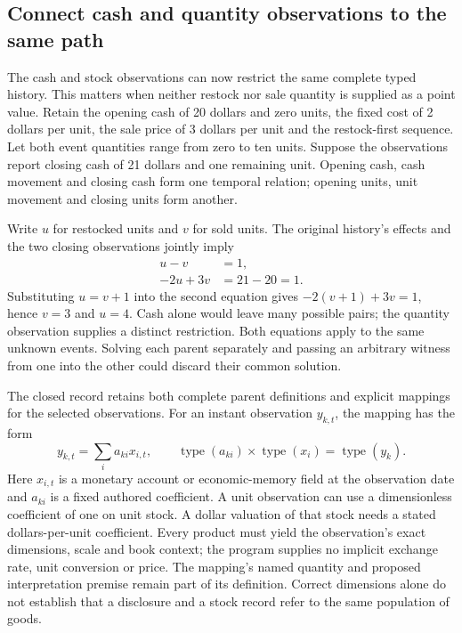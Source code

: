 \subsection{Connect cash and quantity observations to the same path}
\label{sec:typed-history-observation-attachment}

The cash and stock observations can now restrict the same complete typed
history. This matters when neither restock nor sale quantity is supplied as a
point value. Retain the opening cash of 20 dollars and zero units, the fixed
cost of 2 dollars per unit, the sale price of 3 dollars per unit and the
restock-first sequence. Let both event quantities range from zero to ten units.
Suppose the observations report closing cash of 21 dollars and one remaining
unit. Opening cash, cash movement and closing cash form one temporal relation;
opening units, unit movement and closing units form another.

Write \(u\) for restocked units and \(v\) for sold units. The original
history's effects and the two closing observations jointly imply
\begin{align}
\label{eq:typed-observation-solution}
 u-v&=1,\\
 -2u+3v&=21-20=1.
\end{align}
Substituting \(u=v+1\) into the second equation gives
\(-2(v+1)+3v=1\), hence \(v=3\) and \(u=4\). Cash alone would leave
many possible pairs; the quantity observation supplies a distinct restriction.
Both equations apply to the same unknown events. Solving each parent separately
and passing an arbitrary witness from one into the other could discard their
common solution.

The closed  record retains both
complete parent definitions and explicit mappings for the selected observations.
For an instant observation \(y_{k,t}\), the mapping has the form
\begin{equation}
\label{eq:typed-observation-mapping}
 y_{k,t}=\sum_i a_{ki}x_{i,t},\qquad
 \operatorname{type}(a_{ki})\times\operatorname{type}(x_i)
   =\operatorname{type}(y_k).
\end{equation}
Here \(x_{i,t}\) is a monetary account or economic-memory field at the
observation date and \(a_{ki}\) is a fixed authored coefficient. A unit
observation can use a dimensionless coefficient of one on unit stock. A dollar
valuation of that stock needs a stated dollars-per-unit coefficient. Every
product must yield the observation's exact dimensions, scale and book context;
the program supplies no implicit exchange rate, unit conversion or price.
The mapping's named quantity and proposed interpretation premise remain part
of its definition. Correct dimensions alone do not establish that a disclosure
and a stock record refer to the same population of goods.

